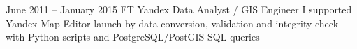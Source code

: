 \hrulefill

\jobentry
    {June 2011 -- January 2015}
    {FT}
    {Yandex}
    {Data Analyst / GIS Engineer}
    {
        I supported Yandex Map Editor launch by data conversion, validation and integrity check with Python scripts and PostgreSQL/PostGIS SQL queries
    }
